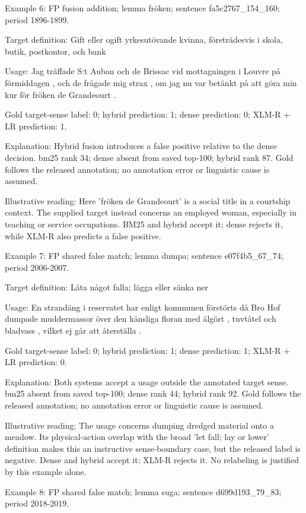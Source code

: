Example 6: FP fusion addition; lemma fröken; sentence fa5c2767\_154\_160; period 1896-1899.

Target definition: Gift eller ogift yrkesutövande kvinna, företrädesvis i skola, butik, postkontor, och bank

Usage: Jag träffade S:t Auban och de Brissac vid mottagningen i Louvre på förmiddagen , och de frågade mig strax , om jag nu var betänkt på att göra min kur för fröken de Grandeourt .

Gold target-sense label: 0; hybrid prediction: 1; dense prediction: 0; XLM-R + LR prediction: 1.

Explanation: Hybrid fusion introduces a false positive relative to the dense decision. bm25 rank 34; dense absent from saved top-100; hybrid rank 87. Gold follows the released annotation; no annotation error or linguistic cause is assumed.

Illustrative reading: Here 'fröken de Grandeourt' is a social title in a courtship context. The supplied target instead concerns an employed woman, especially in teaching or service occupations. BM25 and hybrid accept it; dense rejects it, while XLM-R also predicts a false positive.

Example 7: FP shared false match; lemma dumpa; sentence e07f4b5\_67\_74; period 2006-2007.

Target definition: Låta något falla; lägga eller sänka ner

Usage: En strandäng i reservatet har enligt kommunen förstörts då Bro Hof dumpade muddermassor över den känsliga floran med älgört , tuvtåtel och bladvass , vilket ej går att återställa .

Gold target-sense label: 0; hybrid prediction: 1; dense prediction: 1; XLM-R + LR prediction: 0.

Explanation: Both systems accept a usage outside the annotated target sense. bm25 absent from saved top-100; dense rank 44; hybrid rank 92. Gold follows the released annotation; no annotation error or linguistic cause is assumed.

Illustrative reading: The usage concerns dumping dredged material onto a meadow. Its physical-action overlap with the broad 'let fall; lay or lower' definition makes this an instructive sense-boundary case, but the released label is negative. Dense and hybrid accept it; XLM-R rejects it. No relabeling is justified by this example alone.

Example 8: FP shared false match; lemma suga; sentence d699d193\_79\_83; period 2018-2019.

